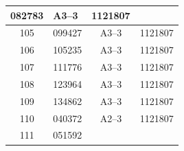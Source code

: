 \documentclass[UTF8,10pt,a4paper,fontset=fandol]{ctexart}
\newcommand{\fieldvalue}[1]{#1}
\begin{document}
\begin{center}
\begin{tabular}{|c|l|c|c|}
\fieldvalue{082783} &
\fieldvalue{A3--3} &
\fieldvalue{1121807}
\\ \hline
\fieldvalue{105} &
\fieldvalue{099427} &
\fieldvalue{A3--3} &
\fieldvalue{1121807}
\\ \hline
\fieldvalue{106} &
\fieldvalue{105235} &
\fieldvalue{A3--3} &
\fieldvalue{1121807}
\\ \hline
\fieldvalue{107} &
\fieldvalue{111776} &
\fieldvalue{A3--3} &
\fieldvalue{1121807}
\\ \hline
\fieldvalue{108} &
\fieldvalue{123964} &
\fieldvalue{A3--3} &
\fieldvalue{1121807}
\\ \hline
\fieldvalue{109} &
\fieldvalue{134862} &
\fieldvalue{A3--3} &
\fieldvalue{1121807}
\\ \hline
\fieldvalue{110} &
\fieldvalue{040372} &
\fieldvalue{A2--3} &
\fieldvalue{1121807}
\\ \hline
\fieldvalue{111} &
\fieldvalue{051592} &

\end{tabular}
\end{center}
\end{document}
